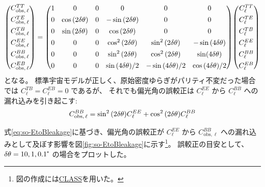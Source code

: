 \documentclass[../../main.tex]{subfiles}
\begin{document}
\begin{equation}
    \mqty( C_{\mathrm{obs},\,\ell}^{TT} \\[1ex]
           C_{\mathrm{obs},\,\ell}^{TE} \\[1ex]
           C_{\mathrm{obs},\,\ell}^{TB} \\[1ex]
           C_{\mathrm{obs},\,\ell}^{EE} \\[1ex]
           C_{\mathrm{obs},\,\ell}^{BB} \\[1ex]
           C_{\mathrm{obs},\,\ell}^{EB} )
    = \mqty( 1 & 0 & 0 & 0 & 0 & 0 \\[1ex]
             0 & \cos\qty(2\delta\theta) & 0 & -\sin\qty(2\delta\theta) & 0 & 0 \\[1ex]
             0 & \sin\qty(2\delta\theta) & 0 & \cos\qty(2\delta\theta) & 0 & 0 \\[1ex]
             0 & 0 & 0 & \cos^2\qty(2\delta\theta) & \sin^2\qty(2\delta\theta) & -\sin\qty(4\delta\theta) \\[1ex]
             0 & 0 & 0 & \sin^2\qty(2\delta\theta) & \cos^2\qty(2\delta\theta) & \sin(4\delta\theta) \\[1ex]
             0 & 0 & 0 & \sin\qty(4\delta\theta)/2 & -\sin\qty(4\delta\theta)/2 & \cos\qty(4\delta\theta)/2 )
    \mqty( C_{\ell}^{TT} \\[1ex]
              C_{\ell}^{TE} \\[1ex]
              C_{\ell}^{TB} \\[1ex]
              C_{\ell}^{EE} \\[1ex]
              C_{\ell}^{BB} \\[1ex]
              C_{\ell}^{EB} )
\end{equation}
となる。
標準宇宙モデルが正しく、原始密度ゆらぎがパリティ不変だった場合では $C_{\ell}^{TB}=C_{\ell}^{EB}=0$ であるが、
それでも偏光角の誤較正は $C_{\ell}^{EE}$ から $C_{\ell}^{BB}$ への漏れ込みを引き起こす:
\begin{equation}
    \label{eq:so-EtoBleakage}
    C_{\mathrm{obs},\,\ell}^{BB} = \sin^2\qty(2\delta\theta)C_{\ell}^{EE} + \cos^2\qty(2\delta\theta)C_{\ell}^{BB}
\end{equation}

式\eqref{eq:so-EtoBleakage}に基づき、偏光角の誤較正が $C_{\ell}^{EE}$ から 
$C_{\mathrm{obs}, \ell}^{BB}$ への漏れ込みとして及ぼす影響を図\ref{fig:so-EtoBleakage}に示す\footnote{図の作成には\href{http://class-code.net}{CLASS}を用いた。}。
誤較正の目安として、 $\delta\theta = 10, 1, 0.1\tcdegree$ の場合をプロットした。
\end{document}
